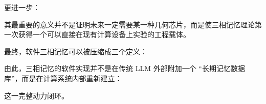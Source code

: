 更进一步：
\begin{statementbox}
\centering
{}
\end{statementbox}

其最重要的意义并不是证明未来一定需要某一种几何芯片，而是使三相记忆理论第一次获得一个可以直接在现有计算设备上实验的工程载体。

最终，软件三相记忆可以被压缩成三个定义：
\begin{statementbox}
\centering
{}
\end{statementbox}
\begin{statementbox}
\centering
{}
\end{statementbox}
\begin{statementbox}
\centering
{}
\end{statementbox}

由此，三相记忆的软件实现并不是在传统 LLM 外部附加一个 ``长期记忆数据库''，而是在计算系统内部重新建立：
\begin{statementbox}
\centering
{}
\end{statementbox}
这一完整动力闭环。